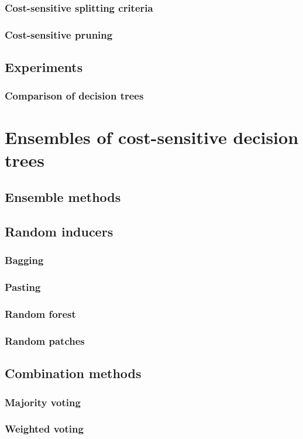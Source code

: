 \documentclass[twoside,openright,titlepage,numbers=noenddot,headinclude,%
               footinclude=true,cleardoublepage=empty,abstractoff,BCOR=5mm,%
               paper=a4,fontsize=11pt,ngerman,american,doublespace]{scrreprt}
\numberwithin{theorem}{chapter}
\numberwithin{definition}{chapter}
\numberwithin{algorithm}{chapter}
\numberwithin{figure}{chapter}
\numberwithin{table}{chapter}
\numberwithin{equation}{chapter}
\begin{document}
			\subsection{Cost-sensitive splitting criteria}
			\subsection{Cost-sensitive pruning}
		\section{Experiments}
			\subsection{Comparison of decision trees}
		
	\chapter{Ensembles of cost-sensitive decision trees}
		\section{Ensemble methods}
			\section{Random inducers}
				\subsection{Bagging}
				\subsection{Pasting}
				\subsection{Random forest}
				\subsection{Random patches}
			\section{Combination methods}
				\subsection{Majority voting}
				\subsection{Weighted voting}
\end{document}
